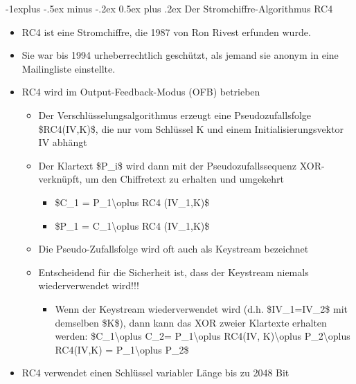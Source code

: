 \documentclass[a4paper]{article}
\makeatletter
\renewcommand{\subsection}{\@startsection{subsection}{2}{0mm}%
 {-1explus -.5ex minus -.2ex}%
 {0.5ex plus .2ex}%
 {\normalfont\normalsize\bfseries}}
\makeatother
\begin{document}
\begin{multicols}{3}
    \subsection{Der Stromchiffre-Algorithmus
        RC4}

    \begin{itemize}
        \item
              RC4 ist eine Stromchiffre, die 1987 von Ron Rivest erfunden wurde.
        \item
              Sie war bis 1994 urheberrechtlich geschützt, als jemand sie anonym in
              eine Mailingliste einstellte.
        \item
              RC4 wird im Output-Feedback-Modus (OFB) betrieben

              \begin{itemize}
                  \item
                        Der Verschlüsselungsalgorithmus erzeugt eine Pseudozufallsfolge
                        \$RC4(IV,K)\$, die nur vom Schlüssel K und einem
                        Initialisierungsvektor IV abhängt
                  \item
                        Der Klartext \$P\_i\$ wird dann mit der Pseudozufallssequenz
                        XOR-verknüpft, um den Chiffretext zu erhalten und umgekehrt

                        \begin{itemize}
                            \item
                                  \$C\_1 = P\_1\textbackslash oplus RC4 (IV\_1,K)\$
                            \item
                                  \$P\_1 = C\_1\textbackslash oplus RC4 (IV\_1,K)\$
                        \end{itemize}
                  \item
                        Die Pseudo-Zufallsfolge wird oft auch als Keystream bezeichnet
                  \item
                        Entscheidend für die Sicherheit ist, dass der Keystream niemals
                        wiederverwendet wird!!!

                        \begin{itemize}
                            \item
                                  Wenn der Keystream wiederverwendet wird (d.h. \$IV\_1=IV\_2\$ mit
                                  demselben \$K\$), dann kann das XOR zweier Klartexte erhalten
                                  werden: \$C\_1\textbackslash oplus C\_2= P\_1\textbackslash oplus
                                  RC4(IV, K)\textbackslash oplus P\_2\textbackslash oplus RC4(IV,K)
                                  = P\_1\textbackslash oplus P\_2\$
                        \end{itemize}
              \end{itemize}
        \item
              RC4 verwendet einen Schlüssel variabler Länge bis zu 2048 Bit


\end{itemize}
\end{multicols}
\end{document}
